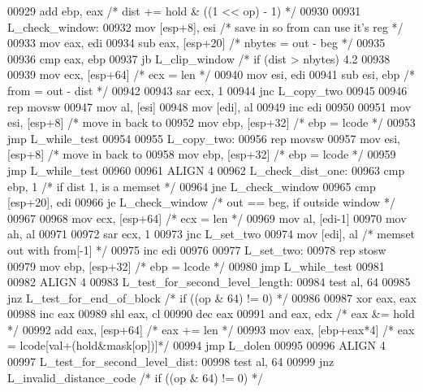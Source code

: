 \begin{DoxyCode}
{{{{{{{{{{{{{{{{{{{{{{{{{{{{{{{{{{{{{{{{{{{{{{{{{{{{{{{{{{{{{{{{{{{{{{{{{{{{{{{{{{{{{{{{{{{{{{{{{{{{{{{{{{{{{{{{{{{{{{{{{{{{{{{{{{{{{{{{{{{{{{{{{{{{{{{{{{{{{{{{{{{{{{{{{{{{{{{{{{{{{{{{{{{{{{{{{{{{{{{{{{{{{{{{{{{{{{{{{{{{{{{{{{{{{{{{{{{{{{{{{{{{{{{{{{{{{{{{{{{{{{{{{{{{{{{{{{{{{{{{{{{{{{{{{{{{{{{{{{{{{{{{{{{{{{{{{{{{{{{{{{{{{{{{{{{{{{{{{{{{{{{{{{{{{{{{{{{{{{{{{{{{00929     add ebp, eax          \textcolor{comment}{/* dist += hold & ((1 << op) - 1) */}
00930 
00931 L\_check\_window:
00932     mov [esp+8], esi       \textcolor{comment}{/* save in so from can use it's reg */}
00933     mov eax, edi
00934     sub eax, [esp+20]      \textcolor{comment}{/* nbytes = out - beg */}
00935 
00936     cmp eax, ebp
00937     jb  L\_clip\_window        \textcolor{comment}{/* if (dist > nbytes) 4.2%
00938 
00939     mov ecx, [esp+64]      \textcolor{comment}{/* ecx = len */}
00940     mov esi, edi
00941     sub esi, ebp          \textcolor{comment}{/* from = out - dist */}
00942 
00943     sar ecx, 1
00944     jnc L\_copy\_two
00945 
00946     rep     movsw
00947     mov al, [esi]
00948     mov [edi], al
00949     inc edi
00950 
00951     mov esi, [esp+8]      \textcolor{comment}{/* move in back to %
00952     mov ebp, [esp+32]     \textcolor{comment}{/* ebp = lcode */}
00953     jmp L\_while\_test
00954 
00955 L\_copy\_two:
00956     rep     movsw
00957     mov esi, [esp+8]      \textcolor{comment}{/* move in back to %
00958     mov ebp, [esp+32]     \textcolor{comment}{/* ebp = lcode */}
00959     jmp L\_while\_test
00960 
00961 ALIGN 4
00962 L\_check\_dist\_one:
00963     cmp ebp, 1            \textcolor{comment}{/* if dist 1, is a memset */}
00964     jne L\_check\_window
00965     cmp [esp+20], edi
00966     je  L\_check\_window    \textcolor{comment}{/* out == beg, if outside window */}
00967 
00968     mov ecx, [esp+64]     \textcolor{comment}{/* ecx = len */}
00969     mov al, [edi-1]
00970     mov ah, al
00971 
00972     sar ecx, 1
00973     jnc L\_set\_two
00974     mov [edi], al         \textcolor{comment}{/* memset out with from[-1] */}
00975     inc edi
00976 
00977 L\_set\_two:
00978     rep     stosw
00979     mov ebp, [esp+32]     \textcolor{comment}{/* ebp = lcode */}
00980     jmp L\_while\_test
00981 
00982 ALIGN 4
00983 L\_test\_for\_second\_level\_length:
00984     test    al, 64
00985     jnz L\_test\_for\_end\_of\_block \textcolor{comment}{/* if ((op & 64) != 0) */}
00986 
00987     xor eax, eax
00988     inc eax
00989     shl eax, cl
00990     dec eax
00991     and eax, edx         \textcolor{comment}{/* eax &= hold */}
00992     add eax, [esp+64]     \textcolor{comment}{/* eax += len */}
00993     mov eax, [ebp+eax*4] \textcolor{comment}{/* eax = lcode[val+(hold&mask[op])]*/}
00994     jmp L\_dolen
00995 
00996 ALIGN 4
00997 L\_test\_for\_second\_level\_dist:
00998     test    al, 64
00999     jnz L\_invalid\_distance\_code \textcolor{comment}{/* if ((op & 64) != 0) */}
}}}}}}}}}}}}}}}}}}}}}}}}}}}}}}}}}}}}}}}}}}}}}}}}}}}}}}}}}}}}}}}}}}}}}}}}}}}}}}}}}}}}}}}}}}}}}}}}}}}}}}}}}}}}}}}}}}}}}}}}}}}}}}}}}}}}}}}}}}}}}}}}}}}}}}}}}}}}}}}}}}}}}}}}}}}}}}}}}}}}}}}}}}}}}}}}}}}}}}}}}}}}}}}}}}}}}}}}}}}}}}}}}}}}}}}}}}}}}}}}}}}}}}}}}}}}}}}}}}}}}}}}}}}}}}}}}}}}}}}}}}}}}}}}}}}}}}}}}}}}}}}}}}}}}}}}}}}}}}}}}}}}}}}}}}}}}}}}}}}}}}}}}}}}}}}}}}}}}}}}}}}}}}}
\end{DoxyCode}
